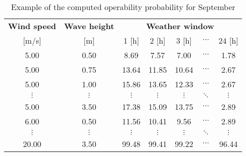 \begin{table}
\label{tab:proba}
\begin{tabular}{ccccccc}
\hline
{\bf Wind speed} & {\bf Wave height} & \multicolumn{ 5}{c}{{\bf Weather window}} \\ %

     [m/s]      &      [m]      &          1 [h] &          2 [h] &          3 [h] &  $\cdots$ &         24 [h] \\
\hline
      5.00 &       0.50 &       8.69 &       7.57 &       7.00 &  $\cdots$ &       1.78 \\

      5.00 &       0.75 &      13.64 &      11.85 &      10.64 &  $\cdots$ &       2.67 \\

      5.00 &       1.00 &      15.86 &      13.65 &      12.33 &  $\cdots$ &       2.67 \\

 $\vdots$ &  $\vdots$ &  $\vdots$ &  $\vdots$ &  $\vdots$ &  $\ddots$ &  $\vdots$ \\

      5.00 &       3.50 &      17.38 &      15.09 &      13.75 &  $\cdots$ &       2.89 \\

      6.00 &       0.50 &      11.56 &      10.41 &       9.56 &  $\cdots$ &       2.89 \\

 $\vdots$ &  $\vdots$ &  $\vdots$ &  $\vdots$ &  $\vdots$ & $\ddots$           &  $\vdots$ \\

     20.00 &       3.50 &      99.48 &      99.41 &      99.22 &  $\cdots$ &      96.44 \\
\hline
\end{tabular}  

\caption{Example of the computed operability probability for September}
\end{table}
